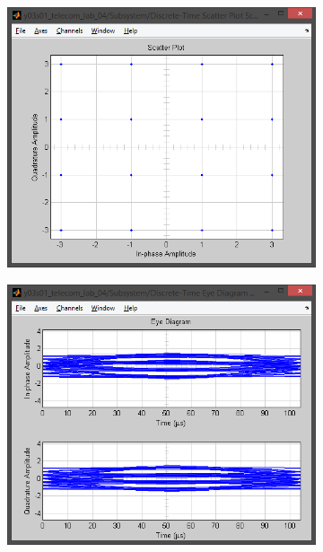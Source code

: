 \documentclass[
	a4paper,
	oneside,
	BCOR = 10mm,
	DIV = 12,
	12pt,
	headings = normal,
]{scrartcl}
\begin{document}
\begin{figure}[!htbp]
\begin{subfigure}{\textwidth / 3}
						\caption{}
						\label{subfig:rolloff-0p6-signal-trajectory-in}
					\end{subfigure}%
					\begin{subfigure}{\textwidth / 3}
						\centering
						\includegraphics[height = 7\baselineskip]{../01-solution/rolloff-0p6-scatter-plot-in.png}
						\caption{}
						\label{subfig:rolloff-0p6-scatter-plot-in}
					\end{subfigure}
					\begin{subfigure}{\textwidth / 3}
						\centering
						\includegraphics[height = 7\baselineskip]{../01-solution/rolloff-0p6-eye-diag-out.png}

\end{subfigure}
\end{figure}
\end{document}

